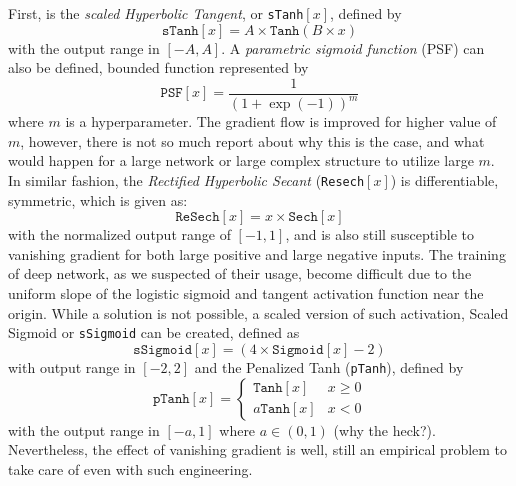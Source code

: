 First, is the \textit{scaled Hyperbolic Tangent}, or \texttt{sTanh}$[x]$, defined by 
\begin{equation}
    \texttt{sTanh}[x] = A\times \texttt{Tanh}(B\times x)
\end{equation}
with the output range in $[-A,A]$. A \textit{parametric sigmoid function} (PSF) can also be defined, bounded function represented by 
\begin{equation}
    \texttt{PSF}[x] = \frac{1}{(1+\exp{(-1)})^{m}}
\end{equation}
where $m$ is a hyperparameter. The gradient flow is improved for higher value of $m$, however, there is not so much report about why this is the case, and what would happen for a large network or large complex structure to utilize large $m$. In similar fashion, the \textit{Rectified Hyperbolic Secant} (\texttt{Resech}$[x]$) is differentiable, symmetric, which is given as: 
\begin{equation}
    \texttt{ReSech}[x] = x\times \texttt{Sech}[x]
\end{equation}
with the normalized output range of $[-1,1]$, and is also still susceptible to vanishing gradient for both large positive and large negative inputs. The training of deep network, as we suspected of their usage, become difficult due to the uniform slope of the logistic sigmoid and tangent activation function near the origin. While a solution is not possible, a scaled version of such activation, Scaled Sigmoid or \texttt{sSigmoid} can be created, defined as 
\begin{equation}
    \texttt{sSigmoid}[x] = (4\times \texttt{Sigmoid}[x]-2)
\end{equation}
with output range in $[-2,2]$ and the Penalized Tanh (\texttt{pTanh}), defined by 
\begin{equation}
    \texttt{pTanh}[x] = \begin{cases}
        \texttt{Tanh}[x] & x \geq 0 \\
        a\texttt{Tanh}[x] & x < 0
    \end{cases}
\end{equation}
with the output range in $[-a,1]$ where $a\in(0,1)$ (why the heck?). Nevertheless, the effect of vanishing gradient is well, still an empirical problem to take care of even with such engineering. 

